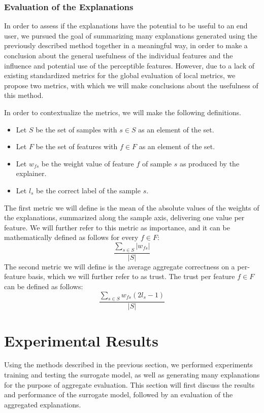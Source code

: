 \documentclass{article}
\begin{document}
			\subsubsection{Evaluation of the Explanations}
			In order to assess if the explanations have the potential to be useful to an end
			user, we pursued the goal of summarizing many explanations generated using the
			previously described method together in a meaningful way, in order to make a
			conclusion about the general usefulness of the individual features and the influence
			and potential use of the perceptible features. However, due to a lack of existing
			standardized metrics for the global evaluation of local metrics, we propose two
			metrics, with which we will make conclusions about the usefulness of this method.
			\par
			In order to contextualize the metrics, we will make the following definitions.
			\begin{itemize}
				\item Let \(S\) be the set of samples with \(s \in S\) as an element of the set.
				\item Let \(F\) be the set of features with \(f \in F\) as an element of the set.
				\item Let \(w_{fs}\) be the weight value of feature \(f\) of sample \(s\) as
					produced by the explainer.
				\item Let \(l_{s}\) be the correct label of the sample \(s\).
			\end{itemize}
			The first metric we will define is the mean of the absolute values of the weights of
			the explanations, summarized along the sample axis, delivering one value per feature.
			We will further refer to this metric as importance, and it can be mathematically
			defined as follows for every \(f \in F\):
			\[\frac{\sum_{s \in S} |w_{fs}|}{|S|}\]
			The second metric we will define is the average aggregate correctness on a per-feature
			basis, which we will further refer to as trust. The trust per feature \(f \in F\) can
			be defined as follows:
			\[\frac{\sum_{s \in S} w_{fs}(2l_{s}-1)}{|S|}\]
	\section{Experimental Results}
	\label{sec:experimental_results}
	Using the methods described in the previous section, we performed experiments training and
	testing the surrogate model, as well as generating many explanations for the purpose of
	aggregate evaluation. This section will first discuss the results and performance of the
	surrogate model, followed by an evaluation of the aggregated explanations.
\end{document}
